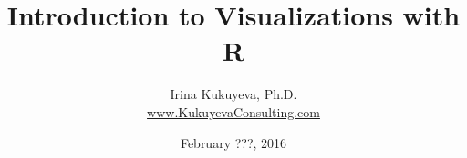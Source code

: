 \title{ Introduction to Visualizations with \ttfamily R \normalfont }
\author{Irina Kukuyeva, Ph.D. \\ \ttfamily \url{www.KukuyevaConsulting.com} \normalfont}
\date{February ???, 2016}



\frame{ \titlepage }
